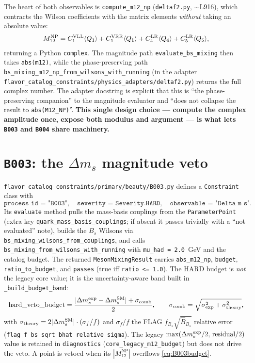 \documentclass[11pt]{article}
\newcommand{\code}[1]{\texttt{#1}}
\newcommand{\Bs}{B_s}
\newcommand{\dms}{\Delta m_s}
\newcommand{\MtwelveNP}{M_{12}^{\mathrm{NP}}}
\theoremstyle{definition}
\begin{document}
The heart of both observables is \code{compute\_m12\_np}
(\code{deltaf2.py}, $\sim$L916), which contracts the Wilson coefficients with the
matrix elements \emph{without} taking an absolute value:
\begin{equation}
\MtwelveNP = C_1^{\rm VLL}\langle Q_1\rangle + C_1^{\rm VRR}\langle Q_1\rangle
 + C_4^{\rm LR}\langle Q_4\rangle + C_5^{\rm LR}\langle Q_5\rangle,
\label{eq:codeM12}
\end{equation}
returning a Python \code{complex}. The magnitude path
\code{evaluate\_bs\_mixing} then takes \code{abs(m12)}, while the
phase-preserving path
\code{bs\_mixing\_m12\_np\_from\_wilsons\_with\_running} (in the adapter
\code{flavor\_catalog\_constraints/physics\_adapters/deltaf2.py}) returns the
full complex number. The adapter docstring is explicit that this is
``the phase-preserving companion'' to the magnitude evaluator and ``does not
collapse the result to \code{abs(M12\_NP)}''. \textbf{This single design choice
--- compute the complex amplitude once, expose both modulus and argument --- is
what lets \code{B003} and \code{B004} share machinery.}

\section{\code{B003}: the $\dms$ magnitude veto}
\label{sec:codeB003}

\code{flavor\_catalog\_constraints/primary/beauty/B003.py} defines a
\code{Constraint} class with
\begin{equation}
\code{process\_id = "B003"},\quad
\code{severity = Severity.HARD},\quad
\code{observable = "Delta m\_s"}.
\end{equation}
Its \code{evaluate} method pulls the mass-basis couplings from the
\code{ParameterPoint} (extra key \code{quark\_mass\_basis\_couplings}; if absent
it passes trivially with a ``not evaluated'' note), builds the $\Bs$ Wilsons via
\code{bs\_mixing\_wilsons\_from\_couplings}, and calls
\code{bs\_mixing\_from\_wilsons\_with\_running} with \code{mu\_had = 2.0}~GeV and
the catalog budget. The returned \code{MesonMixingResult} carries
\code{abs\_m12\_np}, \code{budget}, \code{ratio\_to\_budget}, and \code{passes}
(true iff \code{ratio <= 1.0}). The HARD budget is \emph{not} the legacy core
value; it is the uncertainty-aware band built in \code{\_build\_budget\_band}:
\begin{equation}
\text{hard\_veto\_budget} =
\frac{|\dms^{\rm exp}-\dms^{\rm SM}| + \sigma_{\rm comb}}{2},
\qquad
\sigma_{\rm comb}=\sqrt{\sigma_{\rm exp}^2+\sigma_{\rm theory}^2},
\label{eq:B003budget}
\end{equation}
with $\sigma_{\rm theory}=2|\dms^{\rm SM}|\cdot(\sigma_f/f)$ and
$\sigma_f/f$ the FLAG $f_{\Bs}\sqrt{\hat B_{\Bs}}$ relative error
(\code{flag\_f\_bs\_sqrt\_bhat\_relative\_sigma}). The legacy
$\max(\dms^{\rm exp}/2,\,\text{residual}/2)$ value is retained in
\code{diagnostics} (\code{core\_legacy\_m12\_budget}) but does not drive the veto.
A point is vetoed when its $|\MtwelveNP|$ overflows \eqref{eq:B003budget}.
\end{document}
